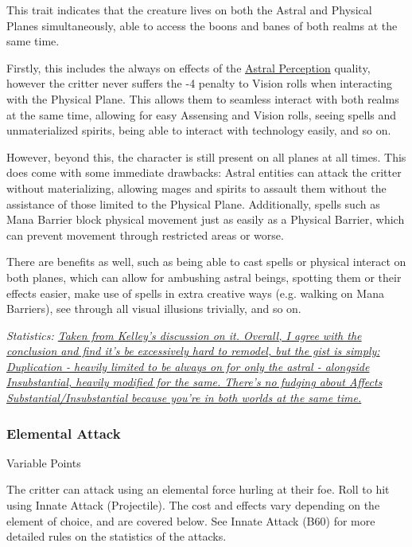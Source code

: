 \begin{multicols*}{3}
	This trait indicates that the creature lives on both the Astral and Physical Planes simultaneously, able to access the boons and banes of both realms at the same time.
	
	Firstly, this includes the always on effects of the \hyperref[astral_perception]{Astral Perception} quality, however the critter never suffers the -4 penalty to Vision rolls when interacting with the Physical Plane. This allows them to seamless interact with both realms at the same time, allowing for easy Assensing and Vision rolls, seeing spells and unmaterialized spirits, being able to interact with technology easily, and so on.
	
	However, beyond this, the character is still present on all planes at all times. This does come with some immediate drawbacks: Astral entities can attack the critter without materializing, allowing mages and spirits to assault them without the assistance of those limited to the Physical Plane. Additionally, spells such as Mana Barrier block physical movement just as easily as a Physical Barrier, which can prevent movement through restricted areas or worse.
	
	There are benefits as well, such as being able to cast spells or physical interact on both planes, which can allow for ambushing astral beings, spotting them or their effects easier, make use of spells in extra creative ways (e.g. walking on Mana Barriers), see through all visual illusions trivially, and so on.

	\textcolor{OliveGreen}{\textit{Statistics: \href{http://forums.sjgames.com/showpost.php?p=507199&postcount=8}{Taken from Kelley's discussion on it. Overall, I agree with the conclusion and find it's be excessively hard to remodel, but the gist is simply: Duplication - heavily limited to be always on for only the astral - alongside Insubstantial, heavily modified for the same. There's no fudging about Affects Substantial/Insubstantial because you're in both worlds at the same time.}}}
	
	\subsubsection{Elemental Attack}\label{elemental_attack}
	\begin{flushright}
		Variable Points
	\end{flushright}
	
	The critter can attack using an elemental force hurling at their foe. Roll to hit using Innate Attack (Projectile). The cost and effects vary depending on the element of choice, and are covered below. See Innate Attack (B60) for more detailed rules on the statistics of the attacks.
	

\end{multicols*}
